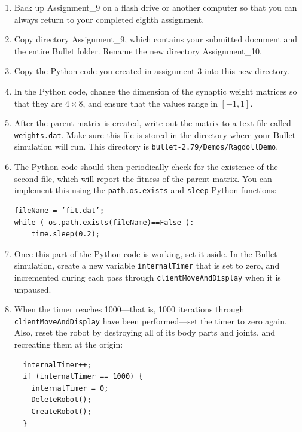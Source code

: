 \documentclass[12pt]{article}
\begin{document}
\begin{enumerate}

\item Back up Assignment\_9 on a flash drive or another computer so that you can always return to your completed eighth assignment.

\item Copy directory Assignment\_9, which contains your submitted document and the entire Bullet folder. Rename the new directory Assignment\_10.

\item Copy the Python code you created in assignment 3 into this new directory.

\item In the Python code, change the dimension of the synaptic weight matrices so that they are $4 \times 8$, and ensure that the values range in $[-1,1]$.

\item After the parent matrix is created, write out the matrix to a text file called \texttt{weights.dat}. Make sure this file is stored in the directory where your Bullet simulation will run. This directory is \verb|bullet-2.79/Demos/RagdollDemo|.

\item The Python code should then periodically check for the existence of the second file, which will report the fitness of the parent matrix. You can implement this using the \texttt{path.os.exists} and \texttt{sleep} Python functions: 
\begin{verbatim}
fileName = ’fit.dat’; 
while ( os.path.exists(fileName)==False ): 
    time.sleep(0.2);
\end{verbatim}

 \item Once this part of the Python code is working, set it aside. In the Bullet simulation, create a new variable \texttt{internalTimer} that is set to zero, and incremented during each pass through \texttt{clientMoveAndDisplay} when it is unpaused.

 \item When the timer reaches 1000---that is, 1000 iterations through \texttt{clientMoveAndDisplay} have been performed---set the timer to zero again. Also, reset the robot by destroying all of its body parts and joints, and recreating them at the origin: 
\begin{verbatim}
  internalTimer++;
  if (internalTimer == 1000) {
    internalTimer = 0;
    DeleteRobot();
    CreateRobot();
  }
\end{verbatim}


\end{enumerate}
\end{document}
